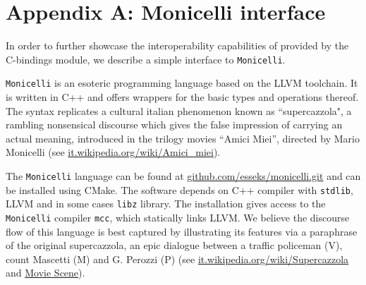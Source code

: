 \documentclass[edipack_sp.tex]{subfiles}
\begin{document}
\section{Appendix A: Monicelli interface}\label{appendixA}
In order to further showcase the interoperability capabilities of
\NAME provided by the C-bindings module, we describe a simple interface to {\tt Monicelli}.

  
{\tt Monicelli} is an esoteric programming language based on the LLVM
toolchain.
It is written in C++ and offers wrappers for the basic
types and operations thereof. The syntax replicates a cultural italian
phenomenon known as ``supercazzola", a rambling nonsensical discourse
which gives the false impression of carrying an actual meaning,
introduced in the trilogy movies ``Amici Miei'', directed by Mario
Monicelli (see
\href{https://it.wikipedia.org/wiki/Amici_miei}{it.wikipedia.org/wiki/Amici\_miei}). 

The {\tt Monicelli} language can be found at
\href{https://github.com/esseks/monicelli.git}{github.com/esseks/monicelli.git}
and can be installed using CMake. The software depends on C++
compiler with {\tt stdlib}, LLVM and in some cases {\tt libz} library. The installation gives access to the {\tt
  Monicelli} compiler {\tt mcc}, which statically links LLVM. 
We believe the discourse flow of this language is best captured by 
illustrating its features via a paraphrase of the original supercazzola, an epic dialogue between a traffic policeman (V), count Mascetti (M) and G. Perozzi (P) (see
\href{https://it.wikipedia.org/wiki/Supercazzola#Origine}{it.wikipedia.org/wiki/Supercazzola}
and \href{https://www.youtube.com/watch?v=SF8YUFdP6eU}{Movie Scene}). 
\end{document}
